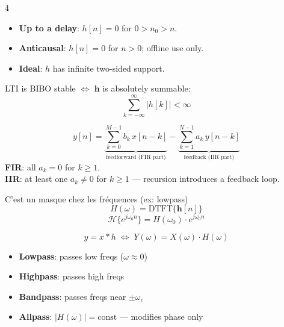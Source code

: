 \documentclass[8pt,a4paper,landscape]{extarticle}
\begin{document}
\begin{multicols*}{4}
\begin{defn}[title=Causality]
\begin{itemize}
  \item \textbf{Up to a delay}: $h[n]=0$ for $0>n_0>n$.
  \item \textbf{Anticausal}: $h[n]=0$ for $n>0$; offline use only.
  \item \textbf{Ideal}: $h$ has infinite two-sided support.
\end{itemize}
\end{defn}

\begin{thm}[title=BIBO Stability]
LTI is BIBO stable $\Longleftrightarrow$ $\mathbf{h}$ is absolutely summable:
\[\sum_{k=-\infty}^{\infty}|h[k]|<\infty\]
\end{thm}

\begin{defn}[title=Constant-Coefficient Difference Equation (CCDE)]
\[y[n]=\underbrace{\sum_{k=0}^{M-1}b_k\,x[n-k]}_{\text{feedforward (FIR part)}}-\underbrace{\sum_{k=1}^{N-1}a_k\,y[n-k]}_{\text{feedback (IIR part)}}\]
\textbf{FIR}: all $a_k=0$ for $k\ge 1$.\\
\textbf{IIR}: at least one $a_k\ne 0$ for $k\ge 1$ — recursion introduces a feedback loop.
\end{defn}

\begin{thm}[title=Frequency Response]
C'est un masque chez les fréquences (ex: lowpass)
\[H(\omega)= \mathrm{DTFT}\{\boldsymbol{h}[n]\} \]
\[\mathcal{H}\{e^{j\omega_0 n}\} = H(\omega_0)\cdot e^{j\omega_0 n}\]
\end{thm}

\begin{thm}[title=Convolution theorem]
\[y=x*h \;\Longleftrightarrow\; Y(\omega)=X(\omega)\cdot H(\omega)\]
\end{thm}

\begin{defn}[title=Filter types by magnitude response]
\begin{itemize}
  \item \textbf{Lowpass}: passes low freqs ($\omega\approx 0$)
  \item \textbf{Highpass}: passes high freqs
  \item \textbf{Bandpass}: passes freqs near $\pm\omega_c$
  \item \textbf{Allpass}: $|H(\omega)|=\text{const}$ — modifies phase only
\end{itemize}
\end{defn}


\end{multicols*}
\end{document}
